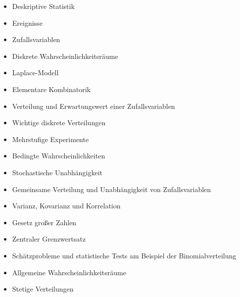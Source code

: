 \begin{course}
\begin{content}
\begin{itemize}\item Deskriptive Statistik  \item Ereignisse  \item Zufallsvariablen  \item Diskrete Wahrscheinlichkeitsräume  \item Laplace-Modell  \item Elementare Kombinatorik  \item Verteilung und Erwartungswert einer Zufallsvariablen  \item Wichtige diskrete Verteilungen  \item Mehrstufige Experimente  \item Bedingte Wahrscheinlichkeiten  \item Stochastische Unabhängigkeit  \item Gemeinsame Verteilung und Unabhängigkeit von Zufallsvariablen  \item Varianz, Kovarianz und Korrelation  \item Gesetz großer Zahlen  \item Zentraler Grenzwertsatz  \item Schätzprobleme und statistische Tests am Beispiel der Binomialverteilung  \item Allgemeine Wahrscheinlichkeitsräume  \item Stetige Verteilungen  \end{itemize}
\end{content}







\end{course}